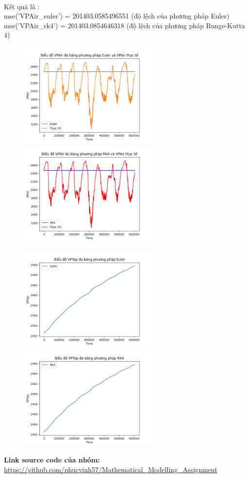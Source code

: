 \documentclass[a4paper]{article}
\begin{document}
\\
Kết quả là :\\
mse('VPAir\_euler') = 201403.0585496551 (độ lệch của phương pháp Euler)\\
mse('VPAir\_rk4') = 201403.0854646318 (độ lệch của phương pháp Runge-Kutta 4)\\

\begin{figure}[h]
\begin{center}
\includegraphics[width=7cm]{5b_euler.png}
\includegraphics[width=7cm]{5b_rk4.png}
\end{center}
\end{figure}

\begin{figure}[h]
\begin{center}
\includegraphics[width=7cm]{5b_TOP_Euler.png}
\includegraphics[width=7cm]{5b_TOP_RK4.png}
\end{center}
\end{figure}

\newpage

\begin{thebibliography}{80}


\textbf{Link source code của nhóm: }
\url{https://github.com/phucvinh57/Mathematical_Modelling_Assignment}


\end{thebibliography}
\end{document}
